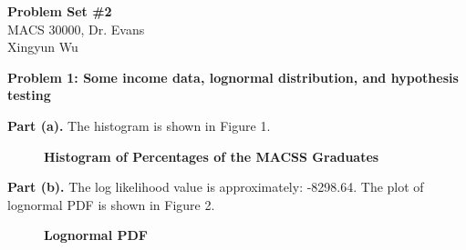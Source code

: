 \documentclass[letterpaper,12pt]{article}
\theoremstyle{definition}
\begin{document}
\begin{flushleft}
  \textbf{\large{Problem Set \#2}} \\
  MACS 30000, Dr. Evans \\
  Xingyun Wu
\end{flushleft}

\vspace{5mm}

\noindent\textbf{Problem 1: Some income data, lognormal distribution, and hypothesis testing}

\vspace{2mm}

\textbf{Part (a).} The histogram is shown in Figure 1.
\begin{figure}[htb]\centering\captionsetup{width=4.0in}
  \caption{\textbf{Histogram of Percentages of the MACSS Graduates}}\label{Fig1a}
\end{figure}

\textbf{Part (b).} The log likelihood value is approximately: -8298.64. The plot of lognormal PDF is shown in Figure 2.
\begin{figure}[htb]\centering\captionsetup{width=4.0in}
  \caption{\textbf{Lognormal PDF}}\label{Fig1b}
\end{figure}
\end{document}
